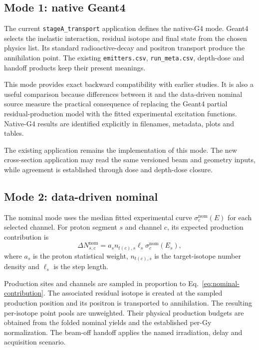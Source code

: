 \documentclass[11pt]{article}
\newcommand{\file}[1]{\texttt{#1}}
\begin{document}
\subsection{Mode 1: native Geant4}

The current \file{stageA\_transport} application defines the native-G4 mode.
Geant4 selects the inelastic interaction, residual isotope and final state from
the chosen physics list.  Its standard radioactive-decay and positron
transport produce the annihilation point.  The existing
\file{emitters.csv}, \file{run\_meta.csv}, depth-dose and handoff products keep
their present meanings.

This mode provides exact backward compatibility with earlier studies.  It is
also a useful comparison because differences between it and the data-driven
nominal source measure the practical consequence of replacing the Geant4
partial residual-production model with the fitted experimental excitation
functions.  Native-G4 results are identified explicitly in filenames,
metadata, plots and tables.

The existing application remains the implementation of this mode.  The new
cross-section application may read the same versioned beam and geometry
inputs, while agreement is established through dose and depth-dose closure.

\subsection{Mode 2: data-driven nominal}

The nominal mode uses the median fitted experimental curve
$\sigma_c^{\mathrm{nom}}(E)$ for each selected channel.  For proton segment
$s$ and channel $c$, its expected production contribution is
\begin{equation}
 \Delta N_{s,c}^{\mathrm{nom}}
 = a_s n_{t(c),s}\ell_s\sigma_c^{\mathrm{nom}}(E_s),
 \label{eq:nominal-contribution}
\end{equation}
where $a_s$ is the proton statistical weight, $n_{t(c),s}$ is the target-isotope
number density and $\ell_s$ is the step length.

Production sites and channels are sampled in proportion to
Eq.~\eqref{eq:nominal-contribution}.  The associated residual isotope is
created at the sampled production position and its positron is transported to
annihilation.  The resulting per-isotope point pools are unweighted.  Their
physical production budgets are obtained from the folded nominal yields and
the established per-Gy normalization.  The beam-off handoff applies the named
irradiation, delay and acquisition scenario.
\end{document}
